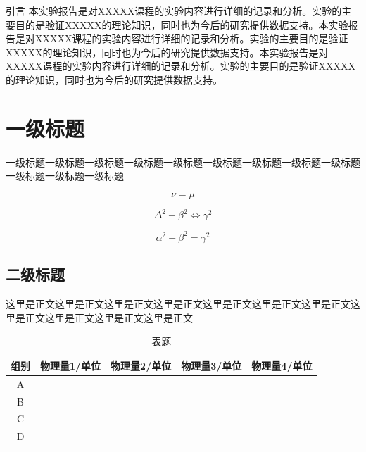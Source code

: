 \par 引言\cite{GKWL20250125003} 本实验报告是对XXXXX课程的实验内容进行详细的记录和分析。实验的主要目的是验证XXXXX的理论知识，同时也为今后的研究提供数据支持。本实验报告是对XXXXX课程的实验内容进行详细的记录和分析。实验的主要目的是验证XXXXX的理论知识，同时也为今后的研究提供数据支持。本实验报告是对XXXXX课程的实验内容进行详细的记录和分析。实验的主要目的是验证XXXXX的理论知识，同时也为今后的研究提供数据支持。 %
\section{一级标题} %

一级标题一级标题一级标题一级标题一级标题一级标题一级标题一级标题一级标题一级标题一级标题一级标题 %

\begin{equation}\label{式} %
    \nu = \mu %
\end{equation} %

\begin{equation}\label{test} %
    \Delta^2 + \beta^2 \Longleftrightarrow \gamma^2 %
\end{equation} %

\begin{equation}\label{直角三角形} %
    \alpha^2 + \beta^2 = \gamma^2 %
\end{equation} %

\subsection{二级标题} %

这里是正文这里是正文这里是正文这里是正文这里是正文这里是正文这里是正文这里是正文这里是正文这里是正文这里是正文 %

\begin{table}[htbp] %
    \centering %
    \caption{表题} %
    \begin{tabular}{ccccc} %
        \toprule %
        {组别} & {物理量1/单位} & {物理量2/单位} & {物理量3/单位} & {物理量4/单位} \\ %
        \midrule %
        A & {} & {} & {} & {} \\ %
        B & {} & {} & {} & {} \\ %
        C & {} & {} & {} & {} \\ %
        D & {} & {} & {} & {} \\ %
        \bottomrule %
    \end{tabular} %
\end{table} %

